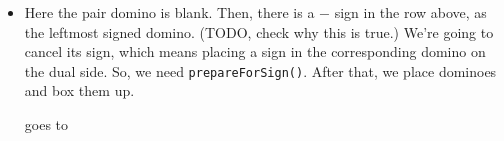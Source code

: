 \documentclass[12pt]{article}
\numberwithin{equation}{section}
\newcommand{\horizontalDominoMaybe}[3]{\filldraw [dominoMaybeStyle] (#2 - 1 + \eps, #1 - 1 + \eps) rectangle + (2 - \teps, 1 -\teps) node [dominoText] {$#3$};}
\newcommand{\verticalDominoMaybeShift}[4]{\filldraw [dominoMaybeStyle] (#2 - 1 + #4 + \eps,  #1 - 1 + \eps) rectangle + (1 - \teps,2 -\teps) node [dominoText] {$#3$};}
\begin{document}
\begin{itemize}
\begin{itemize}
\begin{itemize}
        \begin{figure}[H]
          \centering
        \end{figure}
        \item Here the pair domino is blank.
        Then, there is a $-$ sign in the row above, as the leftmost signed domino.
        (TODO, check why this is true.)
        We're going to cancel its sign, which means placing a sign in the corresponding domino on the dual side.
        So, we need \texttt{prepareForSign()}.
        After that, we place dominoes and box them up.
        \begin{figure}[H]
          \centering
        \end{figure}
        goes to
        \begin{figure}[H]
          \centering
\end{figure}
\end{itemize}
\end{itemize}
\end{itemize}
\end{document}
